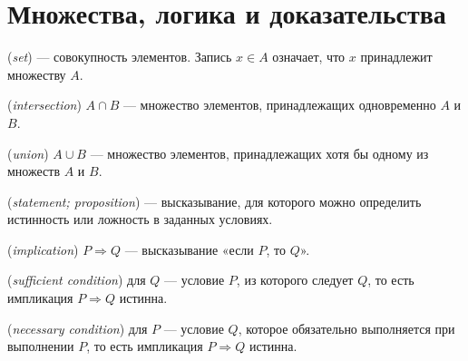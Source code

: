 \chapter{Множества, логика и доказательства}\label{chap:c16}
\begin{definition} (\emph{set}) — совокупность элементов. Запись \(x \in  A\) означает, что \(x\) принадлежит множеству \(A\).\end{definition}
\begin{definition} (\emph{intersection}) \(A\cap B\) — множество элементов, принадлежащих одновременно \(A\) и \(B\).\end{definition}
\begin{definition} (\emph{union}) \(A\cup B\) — множество элементов, принадлежащих хотя бы одному из множеств \(A\) и \(B\).\end{definition}
\begin{definition} (\emph{statement; proposition}) — высказывание, для которого можно определить истинность или ложность в заданных условиях.\end{definition}
\begin{definition} (\emph{implication}) \(P\Rightarrow Q\) — высказывание «если \(P\), то \(Q\)».\end{definition}
\begin{definition} (\emph{sufficient condition}) для \(Q\) — условие \(P\), из которого следует \(Q\), то есть импликация \(P\Rightarrow Q\) истинна.\end{definition}
\begin{definition} (\emph{necessary condition}) для \(P\) — условие \(Q\), которое обязательно выполняется при выполнении \(P\), то есть импликация \(P\Rightarrow Q\) истинна.\end{definition}
